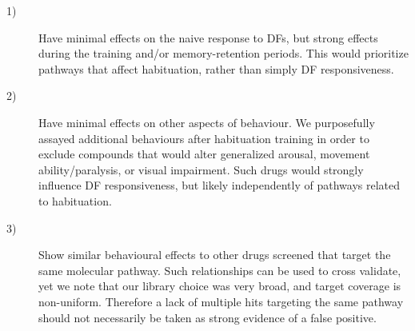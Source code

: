 \documentclass[9pt,lineno]{RandlettLab_elife}
\begin{document}
\begin{description}
\item[1)] Have minimal effects on the naive response to DFs, but strong effects during the training and/or memory-retention periods. This would prioritize pathways that affect habituation, rather than simply DF responsiveness.

\item[2)] Have minimal effects on other aspects of behaviour. We purposefully assayed additional behaviours after habituation training in order to exclude compounds that would alter generalized arousal, movement ability/paralysis, or visual impairment. Such drugs would strongly influence DF responsiveness, but likely independently of pathways related to habituation. 

\item[3)] Show similar behavioural effects to other drugs screened that target the same molecular pathway. Such relationships can be used to cross validate, yet we note that our library choice was very broad, and target coverage is non-uniform. Therefore a lack of multiple hits targeting the same pathway should not necessarily be taken as strong evidence of a false positive. 
\end{description}
\end{document}
